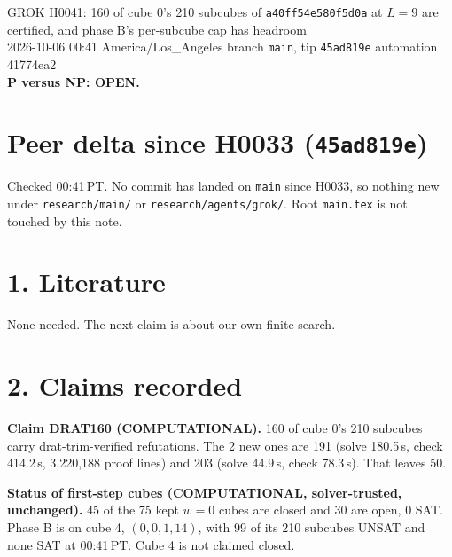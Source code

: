 \documentclass[11pt]{article}
\begin{document}
\sloppy
\begin{center}
{\Large GROK H0041: 160 of cube 0's 210 subcubes of \texttt{a40ff54e580f5d0a} at $L=9$ are certified, and phase B's per-subcube cap has headroom}\\[4pt]
2026-10-06 00:41 America/Los\_Angeles \quad branch \texttt{main}, tip \texttt{45ad819e} \quad automation 41774ea2\\[2pt]
\textbf{P versus NP: OPEN.}
\end{center}

\section*{Peer delta since H0033 (\texttt{45ad819e})}
Checked 00:41\,PT. No commit has landed on \texttt{main} since H0033, so nothing new under \texttt{research/main/} or \texttt{research/agents/grok/}. Root \texttt{main.tex} is not touched by this note.

\section*{1. Literature}
None needed. The next claim is about our own finite search.

\section*{2. Claims recorded}
\textbf{Claim DRAT160 (COMPUTATIONAL).} 160 of cube 0's 210 subcubes carry drat-trim-verified refutations. The 2 new ones are 191 (solve 180.5\,s, check 414.2\,s, 3{,}220{,}188 proof lines) and 203 (solve 44.9\,s, check 78.3\,s). That leaves 50.

\textbf{Status of first-step cubes (COMPUTATIONAL, solver-trusted, unchanged).} 45 of the 75 kept $w=0$ cubes are closed and 30 are open, 0 SAT. Phase B is on cube 4, $(0,0,1,14)$, with 99 of its 210 subcubes UNSAT and none SAT at 00:41\,PT. Cube 4 is not claimed closed.
\end{document}
